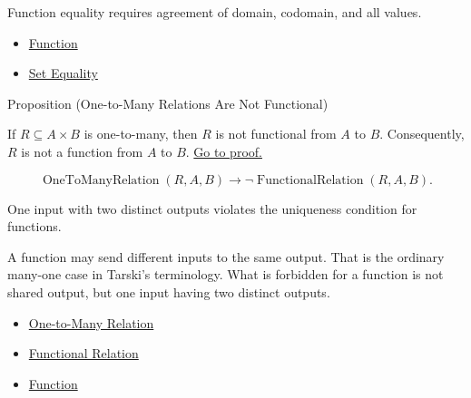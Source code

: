\begin{remark*}[Interpretation]
Function equality requires agreement of domain, codomain, and all values.
\end{remark*}

\begin{dependencies}
\begin{itemize}
  \item \hyperref[def:function]{Function}
  \item \hyperref[def:set-equality]{Set Equality}
\end{itemize}
\end{dependencies}

\begin{propositionbox}{Proposition (One-to-Many Relations Are Not Functional)}
\begin{proposition}\label{prop:one-to-many-not-functional}
If $R\subseteq A\times B$ is one-to-many, then $R$ is not functional from $A$
to $B$. Consequently, $R$ is not a function from $A$ to $B$.
\hyperref[prf:one-to-many-not-functional]{Go to proof.}
\end{proposition}
\end{propositionbox}

\begin{remark*}
\[
  \operatorname{OneToManyRelation}(R,A,B)\to
  \neg\operatorname{FunctionalRelation}(R,A,B).
\]
\end{remark*}

\begin{remark*}[Interpretation]
One input with two distinct outputs violates the uniqueness condition for
functions.
\end{remark*}

\begin{remark*}[Exposition]
A function may send different inputs to the same output. That is the ordinary
many-one case in Tarski's terminology. What is forbidden for a function is not
shared output, but one input having two distinct outputs.
\end{remark*}

\begin{dependencies}
\begin{itemize}
  \item \hyperref[def:one-to-many-relation]{One-to-Many Relation}
  \item \hyperref[def:functional-relation]{Functional Relation}
  \item \hyperref[def:function]{Function}
\end{itemize}
\end{dependencies}

